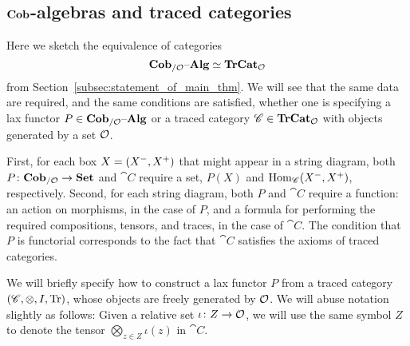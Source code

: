 \documentclass[11pt,oneside,article]{memoir}
\begin{document}
\subsection{$\mathbf{Cob}$-algebras and traced categories}\label{subsec:cobalg_and_trCat}

Here we sketch the equivalence of categories
\begin{equation*}
   \mathbf{Cob}_{/\mathcal{O}}{\text \textendash}\mathbf{Alg}\simeq\mathbf{TrCat}_{\mathcal{O}}
\end{equation*}
from Section~\ref{subsec:statement_of_main_thm}. We will see that the same data are required, and
the same conditions are satisfied, whether one is specifying a lax functor $P\in\mathbf{Cob}_{/\mathcal{O}}{\text \textendash}\mathbf{Alg}$
or a traced category $\mathscr{C}\in\mathbf{TrCat}_{\mathcal{O}}$ with objects generated by a set $\mathcal{O}$.

First, for each box $X=(X^-,X^+)$ that might appear in a string diagram, both $P\colon\mathbf{Cob}_{/\mathcal{O}}\to\mathbf{Set}$ and
$\cat{C}$ require a set, $P(X)$ and $\operatorname{Hom}_{\mathscr{C}}(X^-,X^+)$, respectively.
Second, for each string diagram, both $P$ and $\cat{C}$ require a function: an action on morphisms,
in the case of $P$, and a formula for performing the required compositions, tensors, and traces, in
the case of $\cat{C}$. The condition that $P$ is functorial corresponds to the fact that $\cat{C}$
satisfies the axioms of traced categories.

We will briefly specify how to construct a lax functor $P$ from a traced category $(\mathscr{C},\otimes,I,\operatorname{Tr})$, whose objects are freely generated by $\mathcal{O}$. We will abuse notation slightly as follows: Given a relative set
$\iota\colon Z\to\mathcal{O}$, we will use the same symbol $Z$ to denote
the tensor $\bigotimes_{z\in Z}\iota(z)$ in $\cat{C}$.
\end{document}
